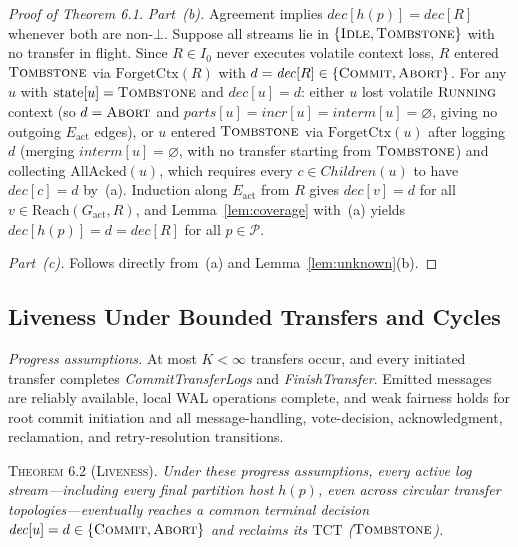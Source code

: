 \documentclass[sigconf,nonacm]{acmart}
\newcommand{\stIdle}{\textsc{Idle}}
\newcommand{\stRun}{\textsc{Running}}
\newcommand{\stCom}{\textsc{Commit}}
\newcommand{\stAbt}{\textsc{Abort}}
\newcommand{\stTomb}{\textsc{Tombstone}}
\newcommand{\Children}{\mathit{Children}}
\newcommand{\parts}{\mathit{parts}}
\newcommand{\incr}{\mathit{incr}}
\newcommand{\interm}{\mathit{interm}}
\newcommand{\dec}{\mathit{dec}}
\begin{document}
\begin{proof}[Proof of Theorem 6.1]
\emph{Part~(b).} Agreement implies \(\dec[h(p)] = \dec[R]\) whenever both are
non-\(\bot\). Suppose all streams lie in \(\{\stIdle,\allowbreak \stTomb\}\)
with no transfer in flight. Since \(R \in I_0\) never executes volatile
context loss, \(R\) entered \(\stTomb\) via \(\mathrm{ForgetCtx}(R)\) with
\(d = \dec[R] \in \{\stCom,\allowbreak \stAbt\}\). For any \(u\) with
\(\mathrm{state}[u] = \stTomb\) and \(\dec[u] = d\): either \(u\) lost
volatile \(\stRun\) context (so \(d = \stAbt\) and \(\parts[u] = \incr[u] =
\interm[u] = \varnothing\), giving no outgoing \(E_{\mathrm{act}}\) edges),
or \(u\) entered \(\stTomb\) via \(\mathrm{ForgetCtx}(u)\) after logging
\(d\) (merging \(\interm[u] = \varnothing\), with no transfer starting from
\(\stTomb\)) and collecting \(\mathrm{AllAcked}(u)\), which requires every
\(c \in \Children(u)\) to have \(\dec[c] = d\) by~(a). Induction along
\(E_{\mathrm{act}}\) from \(R\) gives \(\dec[v] = d\) for all \(v \in
\mathrm{Reach}(G_{\mathrm{act}}, R)\), and Lemma~\ref{lem:coverage} with~(a)
yields \(\dec[h(p)] = d = \dec[R]\) for all \(p \in \mathcal{P}\).

\emph{Part~(c).} Follows directly from~(a) and Lemma~\ref{lem:unknown}(b).
\end{proof}

\subsection{Liveness Under Bounded Transfers and Cycles}
\label{sec:liveness}

\textit{Progress assumptions.} At most \(K < \infty\) transfers occur, and
every initiated transfer completes \emph{CommitTransferLogs} and
\emph{FinishTransfer}. Emitted messages are reliably available, local WAL
operations complete, and weak fairness holds for root commit initiation and
all message-handling, vote-decision, acknowledgment, reclamation, and
retry-resolution transitions.

\noindent\textsc{Theorem 6.2 (Liveness).}
\emph{Under these progress assumptions, every active log stream---including
every final partition host \(h(p)\), even across circular transfer
topologies---eventually reaches a common terminal decision \(\dec[u] = d \in
\{\stCom,\allowbreak \stAbt\}\) and reclaims its \(\mathrm{TCT}\)
(\(\stTomb\)).}
\end{document}
